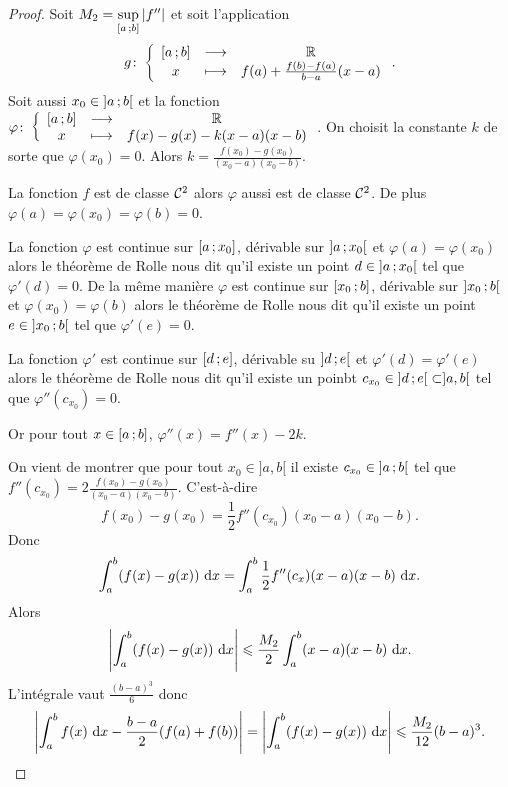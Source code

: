\begin{proof}
  Soit \(M_2 = \sup\limits_{\left[ a \, ; {} b \right]}\left\lvert f''\right\rvert\) et soit l'application
  \begin{equation}
    g\colon\left\{\begin{array}{ccc}\left[ a \, ; {} b \right] & \longrightarrow &\mathbb{R}\\x & \longmapsto & f(a) + \frac{f(b)-f(a)}{b-a}(x-a)\end{array}\right..
  \end{equation}
  Soit aussi \(x_0 \in \left] a \, ; {} b \right[\) et la 
  fonction\(\varphi\colon\left\{\begin{array}{ccc}\left[ a \, ; {} b \right] & \longrightarrow &\mathbb{R}\\x & \longmapsto & f(x)-g(x)-k(x-a)(x-b)\end{array}\right.\). 
  On choisit la constante \(k\) de sorte que \(\varphi(x_0) = 0\).
  Alors \(k = \frac{f(x_0)-g(x_0)}{(x_0-a)(x_0-b)}\).

  La fonction \(f\) est de classe \(\mathcal{C}^{2}\) alors \(\varphi\) aussi est de 
  classe \(\mathcal{C}^{2}\). De plus \(\varphi(a) = \varphi(x_0) = \varphi(b) = 0\).

  La fonction \(\varphi\) est continue sur \(\left[ a \, ; {} x_0 \right]\), dérivable 
  sur \(\left] a \, ; {} x_0 \right[\) et \(\varphi(a) = \varphi(x_0)\) alors le théorème 
  de Rolle nous dit qu'il existe un point \(d \in \left] a \, ; {} x_0 \right[\) tel 
  que \(\varphi'(d) = 0\). De la même manière  \(\varphi\) est continue sur 
  \(\left[ x_0 \, ; {} b \right]\), dérivable sur \(\left] x_0 \, ; {} b \right[\) et 
  \(\varphi(x_0) = \varphi(b)\) alors le théorème de Rolle nous dit qu'il existe 
  un point \(e \in \left] x_0 \, ; {} b \right[\) tel que \(\varphi'(e) = 0\). 

  La fonction \(\varphi'\) est continue sur \(\left[ d \, ; {} e \right]\), dérivable 
  su \(\left] d \, ; {} e \right[\) et \(\varphi'(d) = \varphi'(e)\) alors le théorème de 
  Rolle nous dit qu'il existe un poinbt \(c_{x_0} \in \left] d \, ; {} e \right[ 
  \subset ]a,b[\) tel que \(\varphi''(c_{x_0}) = 0\). 

  Or pour tout \(x \in \left[ a \, ; {} b \right]\), \(\varphi''(x) = f''(x)-2k\).

  On vient de montrer que pour tout \(x_0 \in ]a,b[\) il existe \(c_{x_0} \in 
  \left] a \, ; {} b \right[\) tel que 
  \(f''(c_{x_0}) = 2\frac{f(x_0)-g(x_0)}{(x_0-a)(x_0-b)}\). C'est-à-dire
  \begin{equation}
    f(x_0)-g(x_0) = \frac{1}{2} f''(c_{x_0})(x_0-a)(x_0-b).
  \end{equation}
  Donc
  \begin{equation}
    \int_a^b (f(x)-g(x))\,\mathop{}\mathopen{}\mathrm{d} x = \int_a^b \frac{1}{2} 
    f''(c_{x})(x-a)(x-b)\,\mathop{}\mathopen{}\mathrm{d} x.
  \end{equation}
  Alors
  \begin{equation}
    \left\lvert\int_a^b (f(x)-g(x))\,\mathop{}\mathopen{}\mathrm{d} x\right\rvert \leqslant \frac{M_2}{2} \int_a^b 
    (x-a)(x-b)\,\mathop{}\mathopen{}\mathrm{d} x.
  \end{equation}
  L'intégrale vaut \(\frac{(b-a)^3}{6}\) donc
  \begin{equation}
    \left\lvert\int_a^b f(x)\,\mathop{}\mathopen{}\mathrm{d} x -\frac{b-a}{2}(f(a)+f(b))\right\rvert = \left\lvert\int_a^b 
    (f(x)-g(x))\,\mathop{}\mathopen{}\mathrm{d} x\right\rvert \leqslant \frac{M_2}{12} (b-a)^3.
  \end{equation}
\end{proof}

